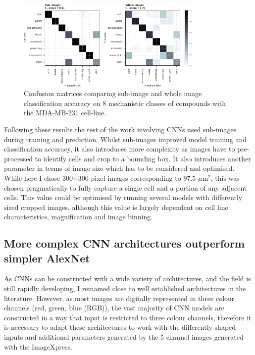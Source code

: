\documentclass[a4paper,11pt,twoside,openright]{scrbook}
\begin{document}
\begin{figure}
    \includegraphics[width=0.8\textwidth]{ch2choppedWholeCM}
    \captionsetup{width=0.8\textwidth}
    \caption[Sub image and whole image confusion matrices]{
Confusion matrices comparing sub-image and whole image classification accuracy on 8 mechanistic classes of compounds with the MDA-MB-231 cell-line.
}
    \label{figure:nn_chopped_vs_whole_cm}
\end{figure}


Following these results the rest of the work involving CNNs used sub-images during training and prediction.
Whilst sub-images improved model training and classification accuracy, it also introduces more complexity as images have to pre-processed to identify cells and crop to a bounding box.
It also introduces another parameter in terms of image size which has to be considered and optimised.
While here I chose 300$\times$300 pixel images corresponding to 97.5 $\mu$m$^2$, this was chosen pragmatically to fully capture a single cell and a portion of any adjacent cells.
This value could be optimised by running several models with differently sized cropped images, although this value is largely dependent on cell line characteristics, magnification and image binning.


\subsection{More complex CNN architectures outperform simpler AlexNet}
As CNNs can be constructed with a wide variety of architectures, and the field is still rapidly developing, I remained close to well established architectures in the literature.
However, as most images are digitally represented in three colour channels (red, green, blue (RGB)), the vast majority of CNN models are constructed in a way that input is restricted to three colour channels, therefore it is necessary to adapt these architectures to work with the differently shaped inputs and additional parameters generated by the 5 channel images generated with the ImageXpress.
\end{document}
